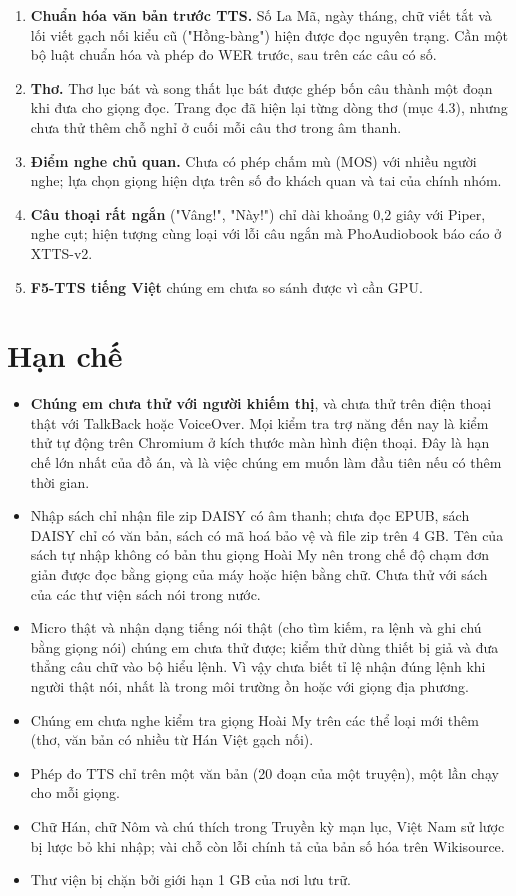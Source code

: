 \documentclass[12pt,a4paper]{article}
\providecommand{\tightlist}{\setlength{\itemsep}{2pt}\setlength{\parskip}{0pt}}
\begin{document}
\begin{enumerate}
\def\labelenumi{\arabic{enumi}.}
\tightlist
\item
  \textbf{Chuẩn hóa văn bản trước TTS.} Số La Mã, ngày tháng, chữ viết tắt và lối viết gạch nối kiểu cũ ("Hồng-bàng") hiện được đọc nguyên trạng. Cần một bộ luật chuẩn hóa và phép đo WER trước, sau trên các câu có số.
\item
  \textbf{Thơ.} Thơ lục bát và song thất lục bát được ghép bốn câu thành một đoạn khi đưa cho giọng đọc. Trang đọc đã hiện lại từng dòng thơ (mục 4.3), nhưng chưa thử thêm chỗ nghỉ ở cuối mỗi câu thơ trong âm thanh.
\item
  \textbf{Điểm nghe chủ quan.} Chưa có phép chấm mù (MOS) với nhiều người nghe; lựa chọn giọng hiện dựa trên số đo khách quan và tai của chính nhóm.
\item
  \textbf{Câu thoại rất ngắn} ("Vâng!", "Này!") chỉ dài khoảng 0,2 giây với Piper, nghe cụt; hiện tượng cùng loại với lỗi câu ngắn mà PhoAudiobook báo cáo ở XTTS-v2.
\item
  \textbf{F5-TTS tiếng Việt} chúng em chưa so sánh được vì cần GPU.
\end{enumerate}

\section{Hạn chế}

\begin{itemize}
\tightlist
\item
  \textbf{Chúng em chưa thử với người khiếm thị}, và chưa thử trên điện thoại thật với TalkBack hoặc VoiceOver. Mọi kiểm tra trợ năng đến nay là kiểm thử tự động trên Chromium ở kích thước màn hình điện thoại. Đây là hạn chế lớn nhất của đồ án, và là việc chúng em muốn làm đầu tiên nếu có thêm thời gian.
\item
  Nhập sách chỉ nhận file zip DAISY có âm thanh; chưa đọc EPUB, sách DAISY chỉ có văn bản, sách có mã hoá bảo vệ và file zip trên 4 GB. Tên của sách tự nhập không có bản thu giọng Hoài My nên trong chế độ chạm đơn giản được đọc bằng giọng của máy hoặc hiện bằng chữ. Chưa thử với sách của các thư viện sách nói trong nước.
\item
  Micro thật và nhận dạng tiếng nói thật (cho tìm kiếm, ra lệnh và ghi chú bằng giọng nói) chúng em chưa thử được; kiểm thử dùng thiết bị giả và đưa thẳng câu chữ vào bộ hiểu lệnh. Vì vậy chưa biết tỉ lệ nhận đúng lệnh khi người thật nói, nhất là trong môi trường ồn hoặc với giọng địa phương.
\item
  Chúng em chưa nghe kiểm tra giọng Hoài My trên các thể loại mới thêm (thơ, văn bản có nhiều từ Hán Việt gạch nối).
\item
  Phép đo TTS chỉ trên một văn bản (20 đoạn của một truyện), một lần chạy cho mỗi giọng.
\item
  Chữ Hán, chữ Nôm và chú thích trong Truyền kỳ mạn lục, Việt Nam sử lược bị lược bỏ khi nhập; vài chỗ còn lỗi chính tả của bản số hóa trên Wikisource.
\item
  Thư viện bị chặn bởi giới hạn 1 GB của nơi lưu trữ.
\end{itemize}
\end{document}
